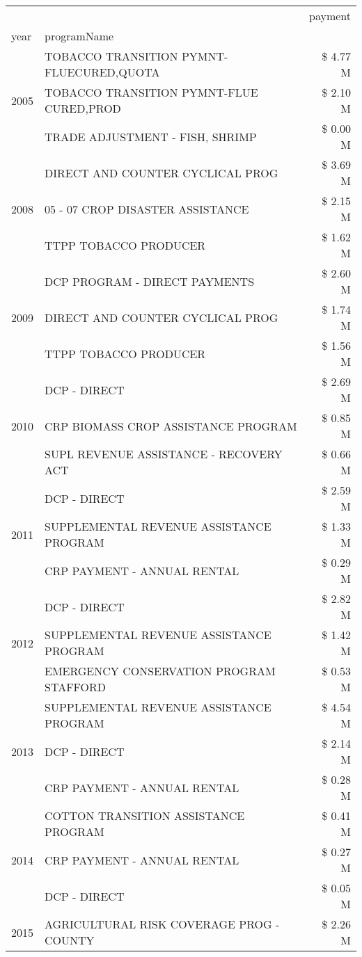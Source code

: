 \begin{tabular}{llr}
\toprule
 &  & payment \\
year & programName &  \\
\midrule
\multirow[t]{3}{*}{2005} & TOBACCO TRANSITION PYMNT-FLUECURED,QUOTA & \$ 4.77 M \\
 & TOBACCO TRANSITION PYMNT-FLUE CURED,PROD & \$ 2.10 M \\
 & TRADE ADJUSTMENT - FISH, SHRIMP & \$ 0.00 M \\
\cline{1-3}
\multirow[t]{3}{*}{2008} & DIRECT AND COUNTER CYCLICAL PROG & \$ 3.69 M \\
 & 05 - 07 CROP DISASTER ASSISTANCE & \$ 2.15 M \\
 & TTPP TOBACCO PRODUCER & \$ 1.62 M \\
\cline{1-3}
\multirow[t]{3}{*}{2009} & DCP PROGRAM - DIRECT PAYMENTS & \$ 2.60 M \\
 & DIRECT AND COUNTER CYCLICAL PROG & \$ 1.74 M \\
 & TTPP TOBACCO PRODUCER & \$ 1.56 M \\
\cline{1-3}
\multirow[t]{3}{*}{2010} & DCP - DIRECT & \$ 2.69 M \\
 & CRP BIOMASS CROP ASSISTANCE PROGRAM & \$ 0.85 M \\
 & SUPL REVENUE ASSISTANCE - RECOVERY ACT & \$ 0.66 M \\
\cline{1-3}
\multirow[t]{3}{*}{2011} & DCP - DIRECT & \$ 2.59 M \\
 & SUPPLEMENTAL REVENUE ASSISTANCE PROGRAM & \$ 1.33 M \\
 & CRP PAYMENT - ANNUAL RENTAL & \$ 0.29 M \\
\cline{1-3}
\multirow[t]{3}{*}{2012} & DCP - DIRECT & \$ 2.82 M \\
 & SUPPLEMENTAL REVENUE ASSISTANCE PROGRAM & \$ 1.42 M \\
 & EMERGENCY CONSERVATION PROGRAM STAFFORD & \$ 0.53 M \\
\cline{1-3}
\multirow[t]{3}{*}{2013} & SUPPLEMENTAL REVENUE ASSISTANCE PROGRAM & \$ 4.54 M \\
 & DCP - DIRECT & \$ 2.14 M \\
 & CRP PAYMENT - ANNUAL RENTAL & \$ 0.28 M \\
\cline{1-3}
\multirow[t]{3}{*}{2014} & COTTON TRANSITION ASSISTANCE PROGRAM & \$ 0.41 M \\
 & CRP PAYMENT - ANNUAL RENTAL & \$ 0.27 M \\
 & DCP - DIRECT & \$ 0.05 M \\
\cline{1-3}
\multirow[t]{3}{*}{2015} & AGRICULTURAL RISK COVERAGE PROG - COUNTY & \$ 2.26 M \\

\end{tabular}
